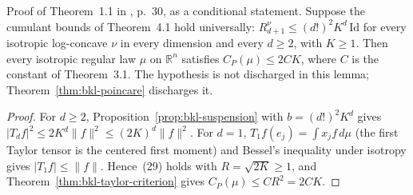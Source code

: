 \begin{lemma}
  \label{lem:bkl-regular-reduction}
  \leanok
  Proof of Theorem~1.1 in \cite{BizeulKlartagLehec2026}, p.~30, as a conditional statement.
  Suppose the cumulant bounds of Theorem~4.1 hold universally: $R^\nu_{d+1}\le(d!)^2K^d\,\mathrm{Id}$
  for every isotropic log-concave $\nu$ in every dimension and every $d\ge2$, with $K\ge1$. Then
  every isotropic regular law $\mu$ on $\mathbb R^n$ satisfies $C_P(\mu)\le2CK$, where $C$ is the
  constant of Theorem~3.1. The hypothesis is not discharged in this lemma; Theorem~\ref{thm:bkl-poincare} discharges it.
\end{lemma}
\begin{proof}
  \leanok
  For $d\ge2$, Proposition~\ref{prop:bkl-suspension} with $b=(d!)^2K^d$ gives
  $|T_df|^2\le2K^d\|f\|^2\le(2K)^d\|f\|^2$. For $d=1$, $T_1f(e_j)=\int x_jf\,d\mu$ (the first
  Taylor tensor is the centered first moment) and Bessel's inequality under isotropy gives
  $|T_1f|\le\|f\|$. Hence~(29) holds with $R=\sqrt{2K}\ge1$, and
  Theorem~\ref{thm:bkl-taylor-criterion} gives $C_P(\mu)\le CR^2=2CK$.
\end{proof}

